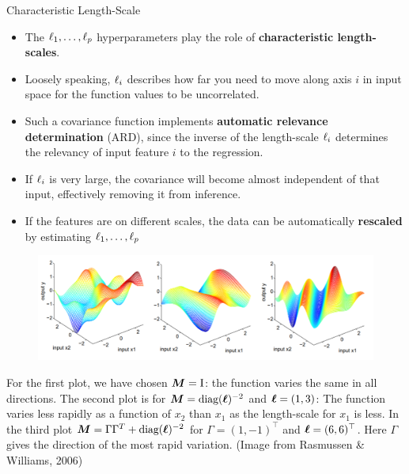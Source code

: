 \begin{frame}[c,allowframebreaks]{Characteristic Length-Scale}
\vspace{4mm}

\begin{itemize} 
\item The $\ell_1,\dots, \ell_p$ hyperparameters play the role of \textbf{characteristic length-scales}.
\vspace{2mm}
\item Loosely speaking, $\ell_i$ describes how far you need to move along axis $i$ in input space for the function values to be uncorrelated.
\vspace{2mm}
\item Such a covariance function implements \textbf{automatic relevance determination} (ARD), since the inverse of the length-scale $\ell_i$ determines the relevancy of input feature $i$ to the regression.
\vspace{2mm}
\item If $\ell_i$ is very large, the covariance will become almost independent of that input, effectively removing it from inference.
\vspace{2mm}
\item If the features are on different scales, the data can be automatically \textbf{rescaled} by estimating $\ell_1,\dots, \ell_p$ 

\end{itemize}



\framebreak


\begin{figure}
	\includegraphics[width = .8\textwidth]{figure_man/covariance2D.png}
\end{figure}

\vspace{3mm}
For the first plot, we have chosen $\bm{M} = \mathrm{I}$: the function varies the same in all directions. The second plot is for $\bm{M} = \text{diag}(\bm{\ell})^{-2}$ and $\bm{\ell} = \left(1, 3 \right)$: The function varies less rapidly as a function of $x_2$ than $x_1$ as the length-scale for $x_1$ is less. In the third plot $\bm{M} = \Gamma \Gamma^T + \text{diag}(\bm{\ell})^{-2}$ for $\Gamma = (1, -1)^\top$ and $\bm{\ell} = (6, 6)^\top$. Here $\Gamma$ gives the direction of the most rapid variation. (Image from Rasmussen \& Williams, 2006)


\end{frame}

\endlecture


